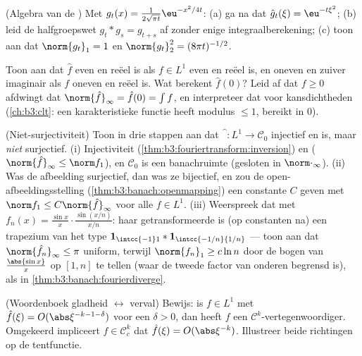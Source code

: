 \begin{exercise}[$\star\star$]\label{exo:b3:fouriertransform:4}
(Algebra van de ) Met $g_t(x) = \frac1{2\sqrt{\pi
t}}\eu^{-x^2/4t}$:
(a) ga na dat $\hat g_t(\xi) = \eu^{-t\xi^2}$;
(b) leid de halfgroepswet $g_t * g_s = g_{t+s}$ af zonder enige
integraalberekening;
(c) toon aan dat $\norm{g_t}_1 = 1$ en $\norm{g_t}_2^2 = (8\pi
t)^{-1/2}$.
\end{exercise}

\begin{exercise}[$\star\star$]\label{exo:b3:fouriertransform:5}
Toon aan dat $\hat f$ even en reëel is als $f \in L^1$ even en
reëel is, en oneven en zuiver imaginair als $f$ oneven en reëel
is. Wat berekent $\hat f(0)$? Leid af dat $f \geq 0$ afdwingt dat
$\norm{\hat f}_\infty = \hat f(0) = \int f$, en interpreteer dat
voor kansdichtheden (\cref{ch:b3:clt}: een karakteristieke
functie heeft modulus $\leq 1$, bereikt in $0$).
\end{exercise}

\begin{exercise}[$\star\star\star$]\label{exo:b3:fouriertransform:6}
(Niet-surjectiviteit) Toon in drie stappen aan dat
$\widehat{\phantom f}\colon L^1 \to \mathcal C_0$ injectief en
 is, maar \emph{niet} surjectief.
(i) Injectiviteit (\cref{thm:b3:fouriertransform:inversion}) en
 ($\norm{\hat f}_\infty \leq \norm f_1$), en
$\mathcal C_0$ is een banachruimte (gesloten in
$\norm\cdot_\infty$).
(ii) Was de afbeelding surjectief, dan was ze bijectief, en zou
de open-afbeeldingsstelling
(\cref{thm:b3:banach:openmapping}) een constante $C$ geven met
$\norm f_1 \leq C\norm{\hat f}_\infty$ voor alle $f \in L^1$.
(iii) Weerspreek dat met $f_n(x) = \frac{\sin
x}{x}\cdot\frac{\sin(x/n)}{x/n}$: haar getransformeerde is (op
constanten na) een trapezium van het type $\mathbf
1_{\intcc{-1}1} * \mathbf 1_{\intcc{-1/n}{1/n}}$ --- toon aan dat
$\norm{\hat f_n}_\infty \leq \pi$ uniform, terwijl $\norm{f_n}_1
\geq c\ln n$ door de bogen van $\frac{\abs{\sin x}}x$ op $[1, n]$
te tellen (waar de tweede factor van onderen begrensd is), als in
\cref{thm:b3:banach:fourierdiverge}.
\end{exercise}

\begin{exercise}[$\star\star$]\label{exo:b3:fouriertransform:7}
(Woordenboek gladheid $\leftrightarrow$ verval) Bewijs: is $f \in
L^1$ met $\hat f(\xi) = O(\abs\xi^{-k-1-\delta})$ voor een
$\delta > 0$, dan heeft $f$ een $\mathcal
C^k$-vertegenwoordiger. Omgekeerd impliceert $f \in \mathcal
C^k_c$ dat $\hat f(\xi) = O(\abs\xi^{-k})$. Illustreer beide
richtingen op de tentfunctie.
\end{exercise}

